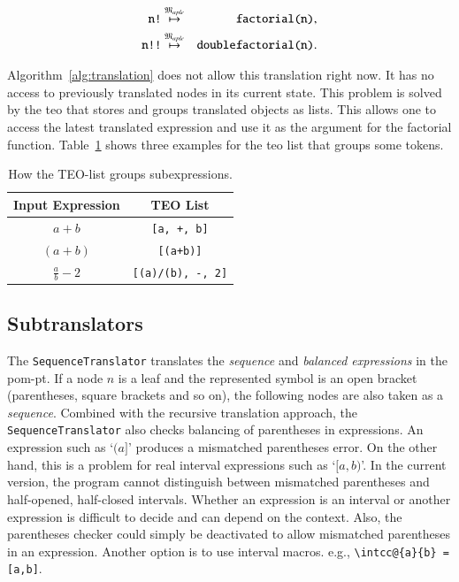 \documentclass[a4paper,11pt]{article}
\newcommand{\langMaple}{\mathfrak{M}_{aple}}
\theoremstyle{defTheoStyle}
\theoremstyle{defExampStyle}
\begin{document}
	\begin{eqnarray*}
		\verb|n!| &\overset{\langMaple}{\mapsto}& \verb|factorial(n)|,\\
		\verb|n!!| &\overset{\langMaple}{\mapsto}& \verb|doublefactorial(n)|.
	\end{eqnarray*}
	
	
	Algorithm~\ref{alg:translation} does not allow this translation right now. It has no access to previously translated nodes in its current state. This problem is solved by the \gls*{teo} that stores and groups translated objects as lists. This allows one to access the latest translated expression and use it as the argument for the factorial function. Table~\ref{tab:teo-list} shows three examples for the \gls*{teo} list that groups some tokens.
	
	\begin{table}[ht]
		\centering
		\begin{tabular}{cc}
			\hline
			Input Expression & TEO List\\
			\hline
			$a+b$ & \verb|[a, +, b]|\\
			$(a+b)$ & \verb|[(a+b)]|\\
			$\frac{a}{b}-2$ & \verb|[(a)/(b), -, 2]|\\
			\hline
		\end{tabular}
		\caption{How the TEO-list groups subexpressions.}
		\label{tab:teo-list}
	\end{table}
	
	\subsection{Subtranslators}\label{sec:subtranslators}
	The \verb|SequenceTranslator| translates the \textit{sequence} and \textit{balanced expressions} in the \gls*{pom-pt}. If a node $n$ is a leaf and the represented symbol is an open bracket (parentheses, square brackets and so on), the following nodes are also taken as a \textit{sequence}. Combined with the recursive translation approach, the \verb|SequenceTranslator| also checks balancing of parentheses in expressions. An expression such as `$(a]$' produces a mismatched parentheses error. On the other hand, this is a problem for real interval expressions such as `$[a,b)$'. In the current version, the program cannot distinguish between mismatched parentheses and half-opened, half-closed intervals. Whether an expression is an interval or another expression is difficult to decide and can depend on the context. Also, the parentheses checker could simply be deactivated to allow mismatched parentheses in an expression. Another option is to use interval macros. e.g., \verb|\intcc@{a}{b} = [a,b]|.
	
\end{document}
